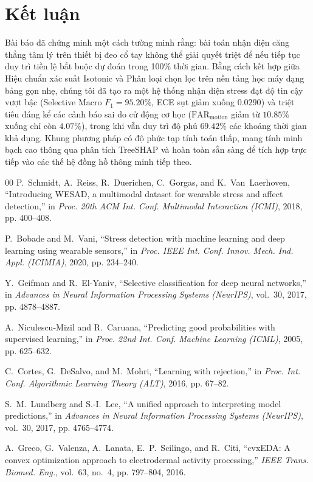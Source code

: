 \documentclass[conference]{IEEEtran}
\begin{document}
\section{Kết luận}
Bài báo đã chứng minh một cách tường minh rằng: bài toán nhận diện căng thẳng tâm lý trên thiết bị đeo cổ tay không thể giải quyết triệt để nếu tiếp tục duy trì tiền lệ bắt buộc dự đoán trong 100\% thời gian. Bằng cách kết hợp giữa Hiệu chuẩn xác suất Isotonic và Phân loại chọn lọc trên nền tảng học máy dạng bảng gọn nhẹ, chúng tôi đã tạo ra một hệ thống nhận diện stress đạt độ tin cậy vượt bậc (Selective Macro $F_1 = 95.20\%$, ECE sụt giảm xuống $0.0290$) và triệt tiêu đáng kể các cảnh báo sai do cử động cơ học ($\text{FAR}_{\text{motion}}$ giảm từ $10.85\%$ xuống chỉ còn $4.07\%$), trong khi vẫn duy trì độ phủ $69.42\%$ các khoảng thời gian khả dụng. Khung phương pháp có độ phức tạp tính toán thấp, mang tính minh bạch cao thông qua phân tích TreeSHAP và hoàn toàn sẵn sàng để tích hợp trực tiếp vào các thế hệ đồng hồ thông minh tiếp theo.

\begin{thebibliography}{00}
P.~Schmidt, A.~Reiss, R.~Duerichen, C.~Gorgas, and K.~Van~Laerhoven, ``Introducing WESAD, a multimodal dataset for wearable stress and affect detection,'' in \textit{Proc. 20th ACM Int. Conf. Multimodal Interaction (ICMI)}, 2018, pp. 400--408.

P.~Bobade and M.~Vani, ``Stress detection with machine learning and deep learning using wearable sensors,'' in \textit{Proc. IEEE Int. Conf. Innov. Mech. Ind. Appl. (ICIMIA)}, 2020, pp. 234--240.

Y.~Geifman and R.~El-Yaniv, ``Selective classification for deep neural networks,'' in \textit{Advances in Neural Information Processing Systems (NeurIPS)}, vol.~30, 2017, pp. 4878--4887.

A.~Niculescu-Mizil and R.~Caruana, ``Predicting good probabilities with supervised learning,'' in \textit{Proc. 22nd Int. Conf. Machine Learning (ICML)}, 2005, pp. 625--632.

C.~Cortes, G.~DeSalvo, and M.~Mohri, ``Learning with rejection,'' in \textit{Proc. Int. Conf. Algorithmic Learning Theory (ALT)}, 2016, pp. 67--82.

S.~M.~Lundberg and S.-I.~Lee, ``A unified approach to interpreting model predictions,'' in \textit{Advances in Neural Information Processing Systems (NeurIPS)}, vol.~30, 2017, pp. 4765--4774.

A.~Greco, G.~Valenza, A.~Lanata, E.~P.~Scilingo, and R.~Citi, ``cvxEDA: A convex optimization approach to electrodermal activity processing,'' \textit{IEEE Trans. Biomed. Eng.}, vol.~63, no.~4, pp. 797--804, 2016.
\end{thebibliography}
\end{document}

